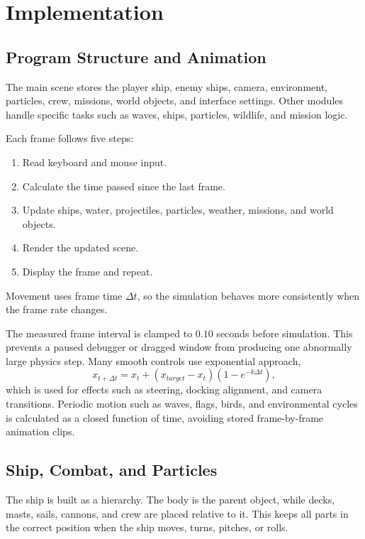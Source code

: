 \documentclass[12pt,a4paper]{report}
\begin{document}
\chapter{Implementation}

\section{Program Structure and Animation}
The main scene stores the player ship, enemy ships, camera, environment, particles, crew, missions, world objects, and interface settings. Other modules handle specific tasks such as waves, ships, particles, wildlife, and mission logic.

Each frame follows five steps:
\begin{enumerate}
    \item Read keyboard and mouse input.
    \item Calculate the time passed since the last frame.
    \item Update ships, water, projectiles, particles, weather, missions, and world objects.
    \item Render the updated scene.
    \item Display the frame and repeat.
\end{enumerate}

Movement uses frame time \(\Delta t\), so the simulation behaves more consistently when the frame rate changes.

The measured frame interval is clamped to \(0.10\) seconds before simulation. This prevents a paused debugger or dragged window from producing one abnormally large physics step. Many smooth controls use exponential approach,
\begin{equation}
x_{t+\Delta t}=x_t+(x_{target}-x_t)\left(1-e^{-k\Delta t}\right),
\end{equation}
which is used for effects such as steering, docking alignment, and camera transitions. Periodic motion such as waves, flags, birds, and environmental cycles is calculated as a closed function of time, avoiding stored frame-by-frame animation clips.

\section{Ship, Combat, and Particles}
The ship is built as a hierarchy. The body is the parent object, while decks, masts, sails, cannons, and crew are placed relative to it. This keeps all parts in the correct position when the ship moves, turns, pitches, or rolls.
\end{document}
